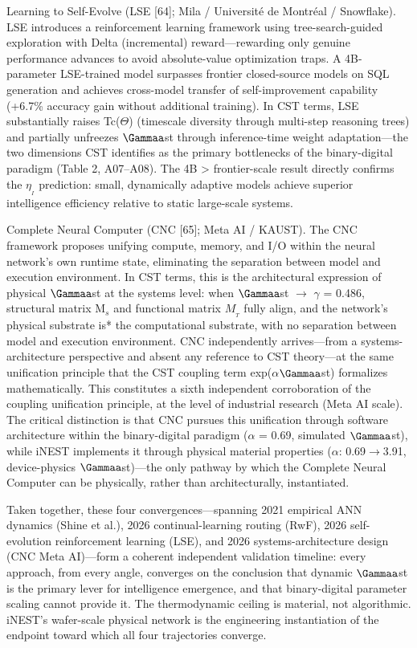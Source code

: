 \documentclass[a4paper,12pt]{article}
\begin{document}
Learning to Self-Evolve (LSE [64]; Mila / Universit\'{e} de Montr\'{e}al / Snowflake). LSE introduces a reinforcement learning framework using tree-search-guided exploration with Delta (incremental) reward---rewarding only genuine performance advances to avoid absolute-value optimization traps. A 4B-parameter LSE-trained model surpasses frontier closed-source models on SQL generation and achieves cross-model transfer of self-improvement capability (+6.7\% accuracy gain without additional training). In CST terms, LSE substantially raises Tc($\Theta$) (timescale diversity through multi-step reasoning trees) and partially unfreezes $\Gammaa$st through inference-time weight adaptation---the two dimensions CST identifies as the primary bottlenecks of the binary-digital paradigm (Table 2, A07--A08). The 4B > frontier-scale result directly confirms the $\eta_{_I}$ prediction: small, dynamically adaptive models achieve superior intelligence efficiency relative to static large-scale systems.


Complete Neural Computer (CNC [65]; Meta AI / KAUST). The CNC framework proposes unifying compute, memory, and I/O within the neural network's own runtime state, eliminating the separation between model and execution environment. In CST terms, this is the architectural expression of physical $\Gammaa$st at the systems level: when $\Gammaa$st $\rightarrow$ $\gamma$ = 0.486, structural matrix M$_s$ and functional matrix $M_{_T}$ fully align, and the network's physical substrate is* the computational substrate, with no separation between model and execution environment. CNC independently arrives---from a systems-architecture perspective and absent any reference to CST theory---at the same unification principle that the CST coupling term exp($\alpha$\cdot$\Gammaa$st) formalizes mathematically. This constitutes a sixth independent corroboration of the coupling unification principle, at the level of industrial research (Meta AI scale). The critical distinction is that CNC pursues this unification through software architecture within the binary-digital paradigm ($\alpha$ = 0.69, simulated $\Gammaa$st), while iNEST implements it through physical material properties ($\alpha$: 0.69$\rightarrow$3.91, device-physics $\Gammaa$st)---the only pathway by which the Complete Neural Computer can be physically, rather than architecturally, instantiated.


Taken together, these four convergences---spanning 2021 empirical ANN dynamics (Shine et al.), 2026 continual-learning routing (RwF), 2026 self-evolution reinforcement learning (LSE), and 2026 systems-architecture design (CNC Meta AI)---form a coherent independent validation timeline: every approach, from every angle, converges on the conclusion that dynamic $\Gammaa$st is the primary lever for intelligence emergence, and that binary-digital parameter scaling cannot provide it. The thermodynamic ceiling is material, not algorithmic. iNEST's wafer-scale physical network is the engineering instantiation of the endpoint toward which all four trajectories converge.
\end{document}
